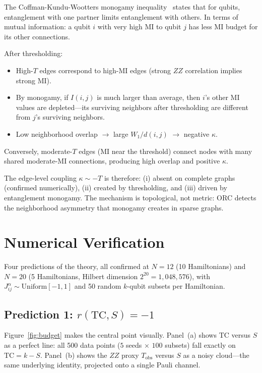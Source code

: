 \documentclass[aps,pra,twocolumn,superscriptaddress,floatfix]{revtex4-2}
\begin{document}
The Coffman-Kundu-Wootters monogamy
inequality~\cite{coffman2000} states that for qubits,
entanglement with one partner limits entanglement
with others.  In terms of mutual information:
a qubit $i$ with very high MI to qubit $j$ has
less MI budget for its other connections.

After thresholding:
\begin{itemize}
\item High-$T$ edges correspond to high-MI edges
(strong $ZZ$ correlation implies strong MI).
\item By monogamy, if $I(i,j)$ is much larger than
average, then $i$'s other MI values are depleted---its
surviving neighbors after thresholding are different
from $j$'s surviving neighbors.
\item Low neighborhood overlap $\to$ large $W_1/d(i,j)$
$\to$ negative $\kappa$.
\end{itemize}

Conversely, moderate-$T$ edges (MI near the threshold)
connect nodes with many shared moderate-MI connections,
producing high overlap and positive $\kappa$.

The edge-level coupling $\kappa \sim -T$ is therefore:
(i) absent on complete graphs (confirmed numerically),
(ii) created by thresholding, and (iii) driven by
entanglement monogamy.  The mechanism is topological,
not metric: ORC detects the neighborhood asymmetry that
monogamy creates in sparse graphs.


\section{Numerical Verification}
\label{sec:verification}

Four predictions of the theory, all confirmed
at $N = 12$ (10 Hamiltonians) and $N = 20$
(5 Hamiltonians, Hilbert dimension $2^{20} = 1{,}048{,}576$),
with $J_{ij}^\alpha \sim \mathrm{Uniform}[-1,1]$
and 50 random $k$-qubit subsets per Hamiltonian.

\subsection{Prediction 1: $r(\mathrm{TC}, S) = -1$}

Figure~\ref{fig:budget} makes the central point visually.
Panel~(a) shows TC versus $S$ as a perfect line:
all 500 data points ($5$ seeds $\times$ $100$ subsets)
fall exactly on $\mathrm{TC} = k - S$.
Panel~(b) shows the $ZZ$ proxy $T_\mathrm{obs}$
versus $S$ as a noisy cloud---the same underlying
identity, projected onto a single Pauli channel.
\end{document}
